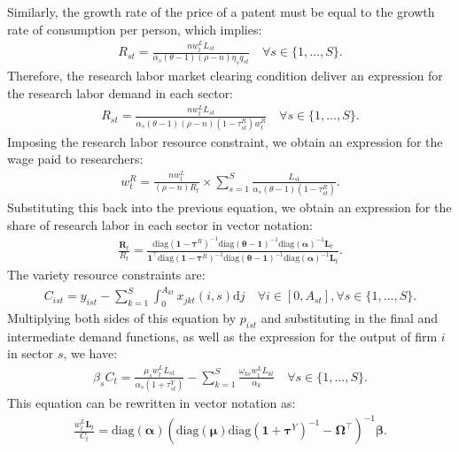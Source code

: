 \documentclass[12pt]{article}
\begin{document}
Similarly, the growth rate of the price of a patent must be equal to the growth rate of consumption per person, which implies:
\begin{align*}
R_{st} = \frac{n w_t^L L_{st}}{\alpha_s (\theta - 1) (\rho - n) \eta_s q_{st}} \quad \forall s \in \{1, \ldots, S\}.
\end{align*}
Therefore, the research labor market clearing condition deliver an expression for the research labor demand in each sector:
\begin{align*}
R_{st} = \frac{n w_t^L L_{st}}{\alpha_s (\theta - 1) (\rho - n) (1 - \tau_{st}^R) w_t^R} \quad \forall s \in \{1, \ldots, S\}.
\end{align*}
Imposing the research labor resource constraint, we obtain an expression for the wage paid to researchers:
\begin{align*}
w_t^R = \frac{n w_t^L}{(\rho - n) R_t} \times \sum_{s = 1}^S \frac{L_{st}}{\alpha_s (\theta - 1) (1 - \tau_{st}^R)}.
\end{align*}
Substituting this back into the previous equation, we obtain an expression for the share of research labor in each sector in vector notation:
\begin{align*}
\frac{\mathbf{R}_t}{R_t} = \frac{\text{diag}(\mathbf{1} - \bm{\tau}^R)^{-1} \text{diag}(\bm{\theta} - \mathbf{1})^{-1} \text{diag}(\bm{\alpha})^{-1} \mathbf{L}_t}{\mathbf{1}^{\top} \text{diag}(\mathbf{1} - \bm{\tau}^R)^{-1} \text{diag}(\bm{\theta} - \mathbf{1})^{-1} \text{diag}(\bm{\alpha})^{-1} \mathbf{L}_t}.
\end{align*}
The variety resource constraints are:
\begin{align*}
C_{ist} = y_{ist} - \sum_{k = 1}^S \int_0^{A_{kt}} x_{jkt}(i, s) \text{d}j \quad \forall i \in [0, A_{st}], \forall s \in \{1, \ldots, S\}.
\end{align*}
Multiplying both sides of this equation by $p_{ist}$ and substituting in the final and intermediate demand functions, as well as the expression for the output of firm $i$ in sector $s$, we have:
\begin{align*}
\beta_s C_t = \frac{\mu_s w_t^L L_{st}}{\alpha_s (1 + \tau_{st}^Y)} - \sum_{k = 1} ^S \frac{\omega_{ks} w_t^L L_{kt}}{\alpha_k} \quad \forall s \in \{1, \ldots, S\}.
\end{align*}
This equation can be rewritten in vector notation as:
\begin{align*}
\frac{w_t^L \mathbf{L}_t}{C_t} = \text{diag}(\bm{\alpha}) (\text{diag}(\bm{\mu}) \text{diag}(\mathbf{1} + \bm{\tau}^Y)^{-1} - \bm{\Omega}^{\top})^{-1} \bm{\beta}.
\end{align*}
\end{document}
